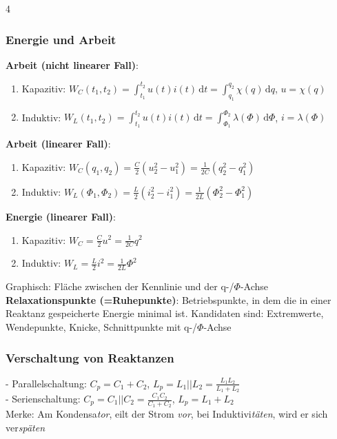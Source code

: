 \documentclass[fs, footer]{latex4ei}
\begin{document}
\begin{multicols*}{4}
{        \subsubsection{Energie und Arbeit}
        \textbf{Arbeit (nicht linearer Fall)}:
        \begin{enumerate}
            \item[-] Kapazitiv: $W_C(t_1, t_2) = \int_{t_1}^{t_2} \! u(t)i(t)\, \mathrm dt = \int_{q_1}^{q_2} \! \chi(q)\, \mathrm dq$, $u=\chi(q)$
            \item[-] Induktiv: $W_L(t_1, t_2) = \int_{t_1}^{t_2} \! u(t)i(t)\, \mathrm dt = \int_{\Phi_1}^{\Phi_2} \! \lambda(\Phi)\, \mathrm d\Phi$, $i=\lambda(\Phi)$
        \end{enumerate}
        \textbf{Arbeit (linearer Fall)}:
        \begin{enumerate}
            \item[-] Kapazitiv: $W_C(q_1,q_2)=\frac{C}{2}(u_2^2-u_1^2)=\frac{1}{2C}(q_2^2-q_1^2)$
            \item[-] Induktiv: $W_L(\Phi_1,\Phi_2)=\frac{L}{2}(i_2^2-i_1^2)=\frac{1}{2L}(\Phi_2^2-\Phi_1^2)$
        \end{enumerate}
        \textbf{Energie (linearer Fall)}:
        \begin{enumerate}
            \item[-] Kapazitiv: $W_C = \frac{C}{2}u^2 = \frac{1}{2C}q^2$
            \item[-] Induktiv: $W_L = \frac{L}{2}i^2 = \frac{1}{2L} \Phi^2$
        \end{enumerate}
        Graphisch: Fläche zwischen der Kennlinie und der q-/$\Phi$-Achse\\
        \textbf{Relaxationspunkte (=Ruhepunkte)}: Betriebspunkte, in dem die in einer Reaktanz gespeicherte Energie minimal ist. Kandidaten sind: Extremwerte, Wendepunkte, Knicke, Schnittpunkte mit q-/$\Phi$-Achse\\
    }

    \subsubsection{Verschaltung von Reaktanzen}
    - Parallelschaltung: $C_p = C_1 + C_2$, $L_p = L_1 || L_2 = \frac{L_1L_2}{L_1+L_2}$\\
    - Serienschaltung: $C_p = C_1 || C_2 = \frac{C_1C_2}{C_1+C_2}$, $L_p = L_1 + L_2$\\


    Merke: Am Kondensa\textsl{tor}, eilt der Strom \textsl{vor}, bei Induktivi\textsl{täten}, wird er sich ver\textsl{späten}\\


\end{multicols*}
\end{document}
